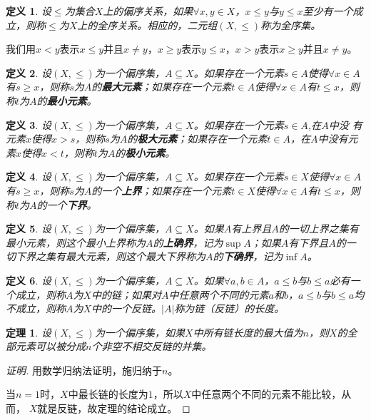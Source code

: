 \documentclass{article}
\newtheorem{Def}{定义}
\newtheorem{Thm}{定理}
\begin{document}
\begin{CJK*}{UTF8}{gbsn}
    \begin{Def}
    设$\leq$为集合$X$上的偏序关系，如果$\forall x, y \in X$，$x \leq y$与$y \leq x$至少有一个成立，则称$\leq$为$X$上的全序关系。相应的，二元组$(X,\leq)$称为全序集。
  \end{Def}
  我们用$x<y$表示$x\leq y$并且$x\neq y$，$x\geq y$表示$y\leq x$，$x > y$表示$x\geq y$并且$x\neq y$。

  \begin{Def}
    设$(X,\leq)$为一个偏序集，$A\subseteq X$。如果存在一个元素$s\in A$使得$\forall x \in A$有$s\geq x$，则称$s$为$A$的{\bfseries 最大元素}；如果存在一个元素$t\in A$使得$\forall x \in A$有$t \leq x$，则称$t$为$A$的{\bfseries 最小元素}。
  \end{Def}

  
    \begin{Def}
    设$(X,\leq)$为一个偏序集，$A\subseteq X$。如果存在一个元素$s\in A$,在$A$中没
    有元素$x$使得$x > s$，则称$s$为$A$的{\bfseries 极大元素}；如果存在一个元素$t\in A$，在$A$中没有元素$x$使得$x < t$，则称$t$为$A$的{\bfseries 极小元素}。
  \end{Def}

    \begin{Def}
    设$(X,\leq)$为一个偏序集，$A\subseteq X$。如果存在一个元素$s\in X$使得$\forall x \in A$有$s\geq x$，则称$s$为$A$的一个{\bfseries 上界}；如果存在一个元素$t\in X$使得$\forall x \in A$有$t \leq x$，则称$t$为$A$的一个{\bfseries 下界}。
  \end{Def}
    \begin{Def}
      设$(X,\leq)$为一个偏序集，$A\subseteq X$。如果$A$有上界且$A$的一切上界之集有最小元素，则这个最小上界称为$A$的{\bfseries 上确界}，记为$\sup A$；如果$A$有下界且$A$的一切下界之集有最大元素，则这个最大下界称为$A$的{\bfseries 下确界}，记为$\inf A$。
  \end{Def}
\begin{Def}
  设$(X,\leq)$为一个偏序集，$A\subseteq X$。如果$\forall a,b\in A$，$a\leq b$与$b\leq a$必有一个成立，则称$A$为$X$中的链；如果对$A$中任意两个不同的元素$a$和$b$，$a\leq b$与$b\leq a$均不成立，则称$A$为$X$中的一个反链。$|A|$称为链（反链）的长度。
\end{Def}
  \begin{Thm}
    设$(X,\leq)$为一个偏序集，如果$X$中所有链长度的最大值为$n$，则$X$的全部元素可以被分成$n$个非空不相交反链的并集。
  \end{Thm}
  \begin{proof}[证明]
    用数学归纳法证明，施归纳于$n$。

    当$n=1$时，$X$中最长链的长度为$1$，所以$X$中任意两个不同的元素不能比较，从而，
    $X$就是反链，故定理的结论成立。


\end{proof}
\end{CJK*}
\end{document}
